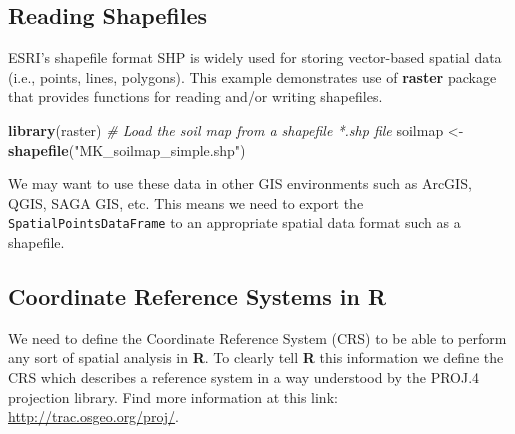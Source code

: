 \documentclass[10pt,b5paper,]{book}
\newenvironment{Shaded}{\begin{snugshade}}{\end{snugshade}}
\newcommand{\CommentTok}[1]{\textcolor[rgb]{0.56,0.35,0.01}{\textit{#1}}}
\newcommand{\DataTypeTok}[1]{\textcolor[rgb]{0.13,0.29,0.53}{#1}}
\newcommand{\KeywordTok}[1]{\textcolor[rgb]{0.13,0.29,0.53}{\textbf{#1}}}
\newcommand{\NormalTok}[1]{#1}
\newcommand{\OperatorTok}[1]{\textcolor[rgb]{0.81,0.36,0.00}{\textbf{#1}}}
\newcommand{\OtherTok}[1]{\textcolor[rgb]{0.56,0.35,0.01}{#1}}
\newcommand{\StringTok}[1]{\textcolor[rgb]{0.31,0.60,0.02}{#1}}
\theoremstyle{definition}
\theoremstyle{definition}
\theoremstyle{definition}
\theoremstyle{remark}
\begin{document}
\hypertarget{reading-shapefiles}{%
\subsection{Reading Shapefiles}\label{reading-shapefiles}}

ESRI's shapefile format SHP is widely used for storing vector-based
spatial data (i.e., points, lines, polygons). This example demonstrates
use of \textbf{raster} package that provides functions for reading
and/or writing shapefiles.

\begin{Shaded}
\begin{Highlighting}[]
\KeywordTok{library}\NormalTok{(raster)}
\CommentTok{# Load the soil map from a shapefile *.shp file}
\NormalTok{soilmap <-}\StringTok{ }\KeywordTok{shapefile}\NormalTok{(}\StringTok{"MK_soilmap_simple.shp"}\NormalTok{)}
\end{Highlighting}
\end{Shaded}

We may want to use these data in other GIS environments such as ArcGIS,
QGIS, SAGA GIS, etc. This means we need to export the
\texttt{SpatialPointsDataFrame} to an appropriate spatial data format
such as a shapefile.

\begin{Shaded}
\end{Shaded}

\hypertarget{coordinate-reference-systems-in-r}{%
\subsection{Coordinate Reference Systems in
R}\label{coordinate-reference-systems-in-r}}

We need to define the Coordinate Reference System (CRS) to be able to
perform any sort of spatial analysis in \textbf{R}. To clearly tell
\textbf{R} this information we define the CRS which describes a
reference system in a way understood by the PROJ.4 projection library.
Find more information at this link: \url{http://trac.osgeo.org/proj/}.
\end{document}
